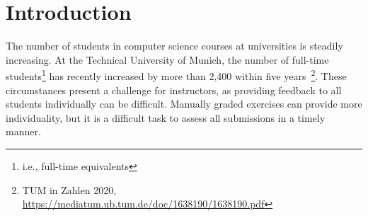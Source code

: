 
\def\proposal{Proposal for}

\usepackage[nolist]{acronym}
\usepackage{csquotes}


\setlength{\evensidemargin}{22pt}
\setlength{\oddsidemargin}{22pt}



\lstset{showspaces=false, numbers=left, frame=single, basicstyle=\small}




\fancyhead{}
\pagestyle{fancy}
\fancyhead[LE]{\slshape \leftmark}
\fancyhead[RO]{\slshape \rightmark}
\headheight=15pt


\section*{Introduction}


The number of students in computer science courses at universities is steadily increasing. At the Technical University of Munich, the number of full-time students\footnote{i.e., full-time equivalents} has recently increased by more than 2,400 within five years~\footnote{TUM in Zahlen 2020, \url{https://mediatum.ub.tum.de/doc/1638190/1638190.pdf}}.
These circumstances present a challenge for instructors, as providing feedback to all students individually can be difficult. Manually graded exercises can provide more individuality, but it is a difficult task to assess all submissions in a timely manner.

